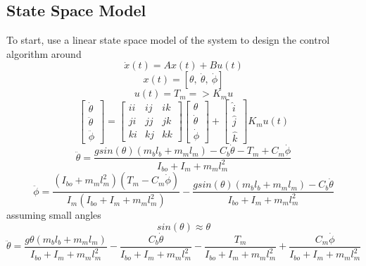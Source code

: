 \documentclass[12pt]{article}
\begin{document}
		\subsection{State Space Model}
			To start, use a linear state space model of the system to design the control algorithm around
			\begin{equation}
				\dot x(t) = Ax(t) + Bu(t)
			\end{equation}
			\begin{equation}
				x(t) = [\theta,\ \dot\theta,\ \dot\phi]
			\end{equation}
			\begin{equation}
				u(t) = T_m => K_mu
			\end{equation}
			\begin{equation}
				\begin{bmatrix}
					\dot\theta \\ \ddot\theta \\ \ddot\phi 
				\end{bmatrix}
				=
				\begin{bmatrix}
					ii & ij & ik \\ ji & jj & jk \\ ki & kj & kk
				\end{bmatrix}
				\begin{bmatrix}
					\theta \\ \dot\theta \\ \dot\phi
				\end{bmatrix}
				+
				\begin{bmatrix}
					\hat{i} \\ \hat{j} \\ \hat{k}
				\end{bmatrix}
				K_mu(t)
			\end{equation}
			\begin{equation}
				\ddot\theta = \frac{gsin(\theta)(m_bl_b + m_ml_m) - C_b \dot\theta - T_m + C_m \dot\phi}{I_{bo}+I_m+m_ml_m^2}
			\end{equation}
			\begin{equation}
				\ddot\phi = \frac{(I_{bo}+m_ml_m^2)(T_m-C_m\dot\phi)}{I_m(I_{bo}+I_m+m_ml_m^2)} - 	\frac{gsin(\theta)(m_bl_b+m_ml_m)-C_b\dot\theta}{I_{bo}+I_m+m_ml_m^2}
			\end{equation}
			assuming small angles
			\begin{equation}
				sin(\theta) \approx \theta
			\end{equation}
			\begin{equation}
				\ddot\theta = \frac{g\theta(m_bl_b + m_ml_m)}{I_{bo}+I_m+m_ml_m^2} - \frac{C_b 	\dot\theta}{I_{bo}+I_m+m_ml_m^2} - \frac{T_m}{I_{bo}+I_m+m_ml_m^2} + \frac{C_m \dot\phi}{I_{bo}+I_m+m_ml_m^2}
			\end{equation}
\end{document}
